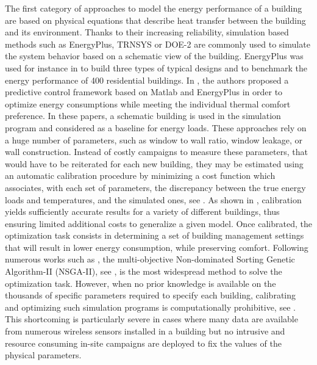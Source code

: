 \documentclass[12pt]{article}
\begin{document}
The first category of approaches to model the energy performance of a building are based on physical equations that describe heat transfer between the building and its environment. Thanks to their increasing reliability, simulation based methods such as EnergyPlus, TRNSYS or DOE-2  are commonly used to simulate the system behavior based on a schematic view of the building. EnergyPlus was used for instance in \cite{shabunko2018energyplus} to build three types of typical designs and to benchmark the energy performance of 400 residential buildings. In \cite{zhao2016occupant}, the authors proposed a predictive control framework based on Matlab and EnergyPlus in order to optimize energy consumptions while meeting the individual thermal comfort preference. In these papers, a schematic building is used in the simulation program and considered as a baseline for energy loads. %
These approaches rely on a huge number of parameters, such as window to wall ratio, window leakage, or wall construction. Instead of costly campaigns to measure these parameters, that would have to be reiterated for each new building, they may be estimated using an automatic calibration procedure by minimizing a cost function which associates, with each set of parameters, the discrepancy between the true energy loads and temperatures, and the simulated ones, see \cite{Coakley2014ARO, Corff2018OPTIMIZINGTC}. As shown in \cite{Nagpal2019AMF}, calibration yields sufficiently accurate results for a variety of different buildings, thus ensuring limited additional costs to generalize a given model. Once calibrated, the optimization task consists in determining a set of building management settings that will result in lower energy consumption, while preserving comfort. Following numerous works such as \cite{Bre2020AnEM}, the multi-objective Non-dominated Sorting Genetic Algorithm-II (NSGA-II), see \cite{Deb2000AFE}, is the most widespread method to solve the optimization task.  However, when no prior knowledge is available on the thousands of specific parameters required to specify each building, calibrating and optimizing such simulation programs is computationally prohibitive, see \cite{Westermann2019SurrogateMF}. This shortcoming is particularly severe in cases where many data are available from numerous wireless sensors installed in a building but no intrusive and resource consuming in-site campaigns are deployed to fix the values of the physical parameters.
\end{document}
